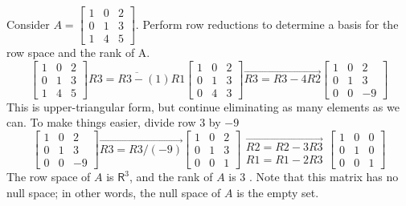 \documentclass[../main.tex]{subfiles}
\begin{document}
\begin{example}  Consider $A = \left[\begin{array}{ccc}
1 & 0 & 2 \\
0 & 1 & 3 \\
1 & 4 & 5
\end{array}\right]
$. Perform row reductions to determine a basis for the row space and the
rank of A.
$$
\left[\begin{array}{lll}
1 & 0 & 2 \\
0 & 1 & 3 \\
1 & 4 & 5
\end{array}\right] \overline{R 3=R 3-(1) R 1}\left[\begin{array}{lll}
1 & 0 & 2 \\
0 & 1 & 3 \\
0 & 4 & 3
\end{array}\right] \overrightarrow{R 3=R 3-4 R 2}\left[\begin{array}{llc}
1 & 0 & 2 \\
0 & 1 & 3 \\
0 & 0 & -9
\end{array}\right]
$$
This is upper-triangular form, but continue eliminating as many elements as we can. To make things easier, divide row $3$ by $-9$
$$
\left[\begin{array}{ccc}
1 & 0 & 2 \\
0 & 1 & 3 \\
0 & 0 & -9
\end{array}\right] \overrightarrow{R 3=R 3 /(-9)}\left[\begin{array}{lll}
1 & 0 & 2 \\
0 & 1 & 3 \\
0 & 0 & 1
\end{array}\right] \begin{array}{c}
\overrightarrow{R 2=R 2-3 R 3} \\ R 1=R 1-2 R 3
\end{array}\left[\begin{array}{lll}
1 & 0 & 0 \\
0 & 1 & 0 \\
0 & 0 & 1
\end{array}\right]
$$
The row space of $A$ is $\mathsf{R}^{3}$, and the rank of $A$ is 3 . Note that this matrix has no null space; in other words, the null space of $A$ is the empty set.
\end{example}
\end{document}
